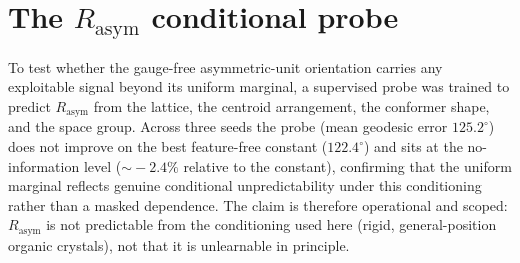 \documentclass[journal=jcisd8,manuscript=suppinfo]{achemso}
\begin{document}
\section{The $R_{\text{asym}}$ conditional probe}\label{sisec:probe}
To test whether the gauge-free asymmetric-unit orientation carries any exploitable
signal beyond its uniform marginal, a supervised probe was trained to predict
$R_{\text{asym}}$ from the lattice, the centroid arrangement, the conformer shape,
and the space group. Across three seeds the probe (mean geodesic error
$125.2^\circ$) does not improve on the best feature-free constant ($122.4^\circ$)
and sits at the no-information level ($\sim\!-2.4\%$ relative to the constant),
confirming that the uniform marginal reflects genuine conditional unpredictability
under this conditioning rather than a masked dependence. The claim is therefore
operational and scoped: $R_{\text{asym}}$ is not predictable from the conditioning
used here (rigid, general-position organic crystals), not that it is unlearnable in
principle.

\end{document}
